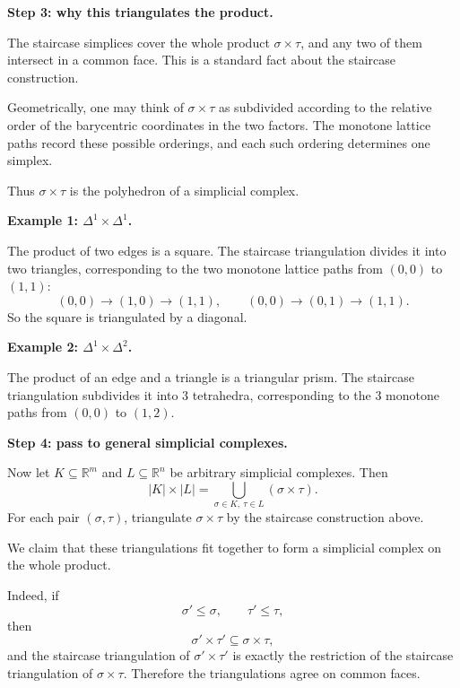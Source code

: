 \begin{solution}
\par

\textbf{Step 3: why this triangulates the product.}

The staircase simplices cover the whole product \(\sigma\times\tau\), and any two of them intersect in a common face. This is a standard fact about the staircase construction.

Geometrically, one may think of \(\sigma\times\tau\) as subdivided according to the relative order of the barycentric coordinates in the two factors. The monotone lattice paths record these possible orderings, and each such ordering determines one simplex.

Thus \(\sigma\times\tau\) is the polyhedron of a simplicial complex.

\par

\textbf{Example 1: \(\Delta^1\times \Delta^1\).}

The product of two edges is a square. The staircase triangulation divides it into two triangles, corresponding to the two monotone lattice paths from \((0,0)\) to \((1,1)\):
\[
(0,0)\to (1,0)\to (1,1),
\qquad
(0,0)\to (0,1)\to (1,1).
\]
So the square is triangulated by a diagonal.

\par

\textbf{Example 2: \(\Delta^1\times \Delta^2\).}

The product of an edge and a triangle is a triangular prism. The staircase triangulation subdivides it into \(3\) tetrahedra, corresponding to the \(3\) monotone paths from \((0,0)\) to \((1,2)\).

\par

\textbf{Step 4: pass to general simplicial complexes.}

Now let \(K\subseteq \mathbb R^m\) and \(L\subseteq \mathbb R^n\) be arbitrary simplicial complexes. Then
\[
|K|\times |L|
=
\bigcup_{\sigma\in K,\ \tau\in L} (\sigma\times\tau).
\]
For each pair \((\sigma,\tau)\), triangulate \(\sigma\times\tau\) by the staircase construction above.

We claim that these triangulations fit together to form a simplicial complex on the whole product.

Indeed, if
\[
\sigma'\le \sigma,
\qquad
\tau'\le \tau,
\]
then
\[
\sigma'\times\tau' \subseteq \sigma\times\tau,
\]
and the staircase triangulation of \(\sigma'\times\tau'\) is exactly the restriction of the staircase triangulation of \(\sigma\times\tau\). Therefore the triangulations agree on common faces.


\end{solution}
